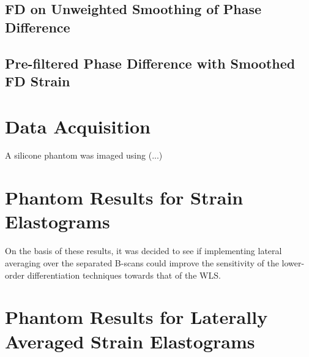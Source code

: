 \subsection{FD on Unweighted Smoothing of Phase Difference}
\subsection{Pre-filtered Phase Difference with Smoothed FD Strain}

\section{Data Acquisition}
A silicone phantom was imaged using (...)

\section{Phantom Results for Strain Elastograms}

On the basis of these results, it was decided to see if implementing lateral averaging over the separated B-scans could improve the sensitivity of the lower-order differentiation techniques towards that of the WLS. 

\section{Phantom Results for Laterally Averaged Strain Elastograms}

